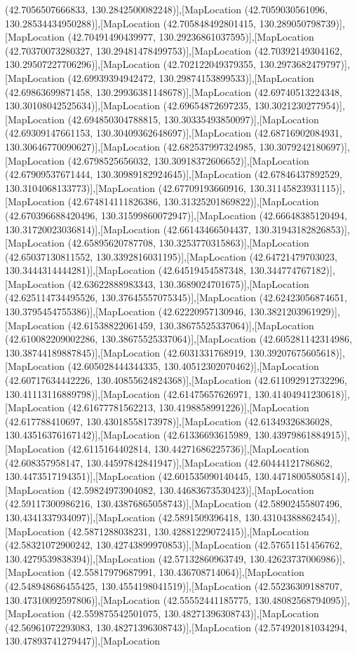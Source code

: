 (42.7056507666833, 130.2842500082248)],[MapLocation (42.7059030561096, 130.28534434950288)],[MapLocation (42.705848492801415, 130.289050798739)],[MapLocation (42.70491490439977, 130.29236861037595)],[MapLocation (42.70370073280327, 130.29481478499753)],[MapLocation (42.70392149304162, 130.29507227706296)],[MapLocation (42.702122049379355, 130.2973682479797)],[MapLocation (42.69939394942472, 130.29874153899533)],[MapLocation (42.69863699871458, 130.29936381148678)],[MapLocation (42.69740513224348, 130.30108042525634)],[MapLocation (42.69654872697235, 130.3021230277954)],[MapLocation (42.694850304788815, 130.30335493850097)],[MapLocation (42.69309147661153, 130.30409362648697)],[MapLocation (42.68716902084931, 130.30646770090627)],[MapLocation (42.682537997324985, 130.3079242180697)],[MapLocation (42.6798525656032, 130.30918372606652)],[MapLocation (42.67909537671444, 130.30989182924645)],[MapLocation (42.67846437892529, 130.3104068133773)],[MapLocation (42.67709193660916, 130.31145823931115)],[MapLocation (42.674814111826386, 130.31325201869822)],[MapLocation (42.670396688420496, 130.31599860072947)],[MapLocation (42.66648385120494, 130.31720023036814)],[MapLocation (42.66143466504437, 130.31943182826853)],[MapLocation (42.65895620787708, 130.3253770315863)],[MapLocation (42.65037130811552, 130.3392816031195)],[MapLocation (42.64721479703023, 130.3444314444281)],[MapLocation (42.64519454587348, 130.344774767182)],[MapLocation (42.63622888983343, 130.3689024701675)],[MapLocation (42.625114734495526, 130.37645557075345)],[MapLocation (42.62423056874651, 130.3795454755386)],[MapLocation (42.62220957130946, 130.3821203961929)],[MapLocation (42.61538822061459, 130.38675525337064)],[MapLocation (42.610082209002286, 130.38675525337064)],[MapLocation (42.605281142314986, 130.38744189887845)],[MapLocation (42.6031331768919, 130.39207675605618)],[MapLocation (42.605028444344335, 130.40512302070462)],[MapLocation (42.60717634442226, 130.40855624824368)],[MapLocation (42.611092912732296, 130.41113116889798)],[MapLocation (42.61475657626971, 130.41404941230618)],[MapLocation (42.61677781562213, 130.4198858991226)],[MapLocation (42.617788410697, 130.43018558173978)],[MapLocation (42.61349326836028, 130.43516376167142)],[MapLocation (42.61336693615989, 130.43979861884915)],[MapLocation (42.6115164402814, 130.44271686225736)],[MapLocation (42.608357958147, 130.44597842841947)],[MapLocation (42.60444121786862, 130.4473517194351)],[MapLocation (42.601535090140445, 130.44718005805814)],[MapLocation (42.59824973904082, 130.44683673530423)],[MapLocation (42.59117300986216, 130.43876865058743)],[MapLocation (42.58902455807496, 130.4341337934097)],[MapLocation (42.5891509396418, 130.43104388862454)],[MapLocation (42.5871288038231, 130.42881229072415)],[MapLocation (42.58321072900242, 130.42743899970853)],[MapLocation (42.57651151456762, 130.4279539838394)],[MapLocation (42.57132860963749, 130.42623737006986)],[MapLocation (42.55817979687991, 130.436708714064)],[MapLocation (42.548948686455425, 130.4554198041519)],[MapLocation (42.55236309188707, 130.47310092597806)],[MapLocation (42.55552441185775, 130.48082568794095)],[MapLocation (42.559875542501075, 130.48271396308743)],[MapLocation (42.56961072293083, 130.48271396308743)],[MapLocation (42.574920181034294, 130.47893741279447)],[MapLocation 